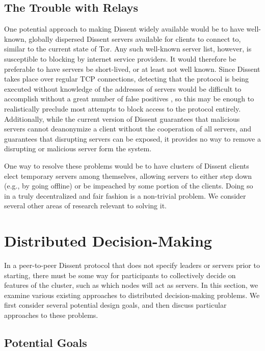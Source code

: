   \subsection{The Trouble with Relays}
  \label{Subsection:Relays}
    One potential approach to making Dissent widely available would be to have
    well-known, globally dispersed Dissent servers available for clients to
    connect to, similar to the current state of Tor. Any such well-known server
    list, however, is susceptible to blocking by internet service providers. It
    would therefore be preferable to have servers be short-lived, or at least
    not well known. Since Dissent takes place over regular TCP connections,
    detecting that the protocol is being executed without knowledge of the
    addresses of servers would be difficult to accomplish without a great number
    of false positives \cite{houmansadr_parrot_2013}, so this may be enough to
    realistically preclude most attempts to block access to the protocol
    entirely.  Additionally, while the current version of Dissent guarantees
    that malicious servers cannot deanonymize a client without the cooperation
    of all servers, and guarantees that disrupting servers can be exposed, it
    provides no way to remove a disrupting or malicious server form the system.

    One way to resolve these problems would be to have clusters of Dissent
    clients elect temporary servers among themselves, allowing servers to either
    step down (e.g., by going offline) or be impeached by some portion of the
    clients.  Doing so in a truly decentralized and fair fashion is a
    non-trivial problem.  We consider several other areas of research relevant
    to solving it.

\section{Distributed Decision-Making}
\label{Section:p2p}
  In a peer-to-peer Dissent protocol that does not specify leaders or servers
  prior to starting, there must be some way for participants to collectively
  decide on features of the cluster, such as which nodes will act as servers. In
  this section, we examine various existing approaches to distributed
  decision-making problems. We first consider several potential design goals,
  and then discuss particular approaches to these problems.

  \subsection{Potential Goals}
